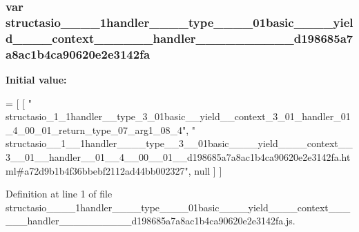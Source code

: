 \subsubsection[{structasio\+\_\+\+\_\+1\+\_\+\+\_\+1handler\+\_\+\+\_\+\+\_\+\+\_\+type\+\_\+\+\_\+3\+\_\+\+\_\+01basic\+\_\+\+\_\+\+\_\+\+\_\+yield\+\_\+\+\_\+\+\_\+\+\_\+context\+\_\+\+\_\+3\+\_\+\+\_\+01\+\_\+\+\_\+handler\+\_\+\+\_\+01\+\_\+\+\_\+4\+\_\+\+\_\+00\+\_\+\+\_\+01\+\_\+\+\_\+d198685a7a8ac1b4ca90620e2e3142fa}]{\setlength{\rightskip}{0pt plus 5cm}var structasio\+\_\+\+\_\+\_\+\+\_\+1handler\+\_\+\+\_\+\+\_\+\+\_\+type\+\_\+\+\_\+\_\+\+\_\+01basic\+\_\+\+\_\+\+\_\+\+\_\+yield\+\_\+\+\_\+\+\_\+\+\_\+context\+\_\+\+\_\+\_\+\+\_\+\_\+\+\_\+handler\+\_\+\+\_\+\_\+\+\_\+\_\+\+\_\+\_\+\+\_\+\_\+\+\_\+d198685a7a8ac1b4ca90620e2e3142fa}\label{structasio____1____1handler________type____3____01basic________yield________context____3____01__96e6397dcc7e5bbdb98d794a507c06db_a9fc1eab51f72ae84f3bdbe2f2637cc51}
{\bfseries Initial value\+:}
\begin{DoxyCode}
=
[
    [ \textcolor{stringliteral}{"
      structasio\_1\_1handler\_\_type\_3\_01basic\_\_yield\_\_context\_3\_01\_handler\_01\_4\_00\_01\_return\_type\_07\_arg1\_08\_4"}, \textcolor{stringliteral}{"
      structasio\_\_1\_\_1handler\_\_\_\_type\_\_3\_\_01basic\_\_\_\_yield\_\_\_\_context\_\_3\_\_01\_\_handler\_\_01\_\_4\_\_00\_\_01\_\_d198685a7a8ac1b4ca90620e2e3142fa.html#a72d9b1b4f36bbebf2112ad44bb002327"}, null ]
]
\end{DoxyCode}


Definition at line 1 of file structasio\+\_\+\+\_\+\_\+\+\_\+1handler\+\_\+\+\_\+\+\_\+\+\_\+type\+\_\+\+\_\+\_\+\+\_\+01basic\+\_\+\+\_\+\+\_\+\+\_\+yield\+\_\+\+\_\+\+\_\+\+\_\+context\+\_\+\+\_\+\_\+\+\_\+\_\+\+\_\+handler\+\_\+\+\_\+\_\+\+\_\+\_\+\+\_\+\_\+\+\_\+\_\+\+\_\+d198685a7a8ac1b4ca90620e2e3142fa.\+js.

